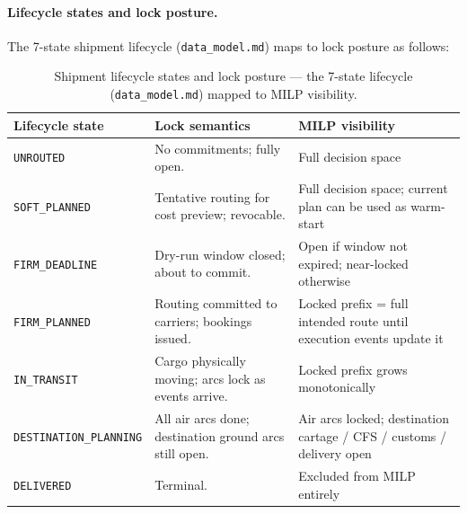 \documentclass[11pt,a4paper]{article}
\theoremstyle{definition}
\begin{document}
\paragraph{Lifecycle states and lock posture.}
The 7-state shipment lifecycle (\texttt{data\_model.md}) maps to lock posture
as follows:
\begin{table}[H]
\centering
\caption{Shipment lifecycle states and lock posture --- the 7-state lifecycle (\texttt{data\_model.md}) mapped to MILP visibility.}
\label{tab:lifecycle-states}
\begin{tabular}{lp{6.8cm}p{4.5cm}}
\toprule
Lifecycle state & Lock semantics & MILP visibility \\
\midrule
\texttt{UNROUTED} & No commitments; fully open. & Full decision space \\
\texttt{SOFT\_PLANNED} & Tentative routing for cost preview; revocable. & Full decision space; current plan can be used as warm-start \\
\texttt{FIRM\_DEADLINE} & Dry-run window closed; about to commit. & Open if window not expired; near-locked otherwise \\
\texttt{FIRM\_PLANNED} & Routing committed to carriers; bookings issued. & Locked prefix = full intended route until execution events update it \\
\texttt{IN\_TRANSIT} & Cargo physically moving; arcs lock as events arrive. & Locked prefix grows monotonically \\
\texttt{DESTINATION\_PLANNING} & All air arcs done; destination ground arcs still open. & Air arcs locked; destination cartage / CFS / customs / delivery open \\
\texttt{DELIVERED} & Terminal. & Excluded from MILP entirely \\
\bottomrule
\end{tabular}
\end{table}
\end{document}
